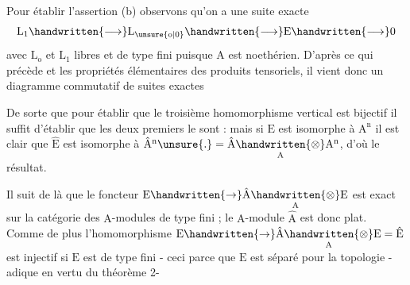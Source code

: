 Pour établir l'assertion (b) observons qu'on a une suite exacte
\[
\mathrm L_1\handwritten{\longrightarrow}\mathrm L_{\unsure{\mathrm o|0}}\handwritten{\longrightarrow}\mathrm E\handwritten{\longrightarrow}0
\]
avec $\mathrm L_{\mathrm o}$ et $\mathrm L_1$ libres et de type fini puisque $\mathrm A$ est noethérien. D'après ce qui précède et les propriétés élémentaires des produits tensoriels, il vient donc un diagramme commutatif de suites exactes


De sorte que pour établir que le troisième homomorphisme vertical est bijectif il suffit d'établir que les deux premiers le sont : mais si $\mathrm E$ est isomorphe à $\mathrm A^{\mathrm n}$ il est clair que $\hat{\mathrm E}$ est isomorphe à $\hat{\mathrm A}^{\mathrm n}\unsure{.}=\hat{\mathrm A}\underset{\mathrm A}{\handwritten{\otimes}}\mathrm A^{\mathrm n}$, d'où le résultat.

Il suit de là que le foncteur $\mathrm E\handwritten{\to}\hat{\mathrm A}\underset{\mathrm A}{\handwritten{\otimes}}\mathrm E$ est exact sur la catégorie des $\mathrm A$-modules de type fini ; le $\mathrm A$-module $\hat{\mathrm A}$ est donc plat. Comme de plus l'homomorphisme $\mathrm E\handwritten{\to}\hat{\mathrm A}\underset{\mathrm A}{\handwritten{\otimes}}\mathrm E=\hat{\mathrm E}$ est injectif si $\mathrm E$ est de type fini - ceci parce que $\mathrm E$ est séparé pour la topologie \quad -adique en vertu du théorème 2-


